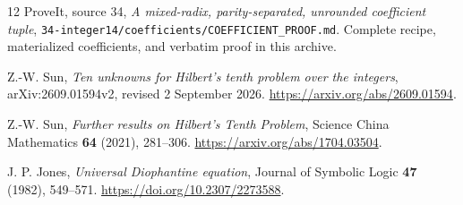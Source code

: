\documentclass[11pt,a4paper]{article}
\theoremstyle{definition}\newtheorem{definition}[theorem]{Definition}
\theoremstyle{remark}\newtheorem{remark}[theorem]{Remark}
\numberwithin{equation}{section}
\begin{document}
\begin{thebibliography}{12}
ProveIt, source 34,
\emph{A mixed-radix, parity-separated, unrounded coefficient tuple},
\texttt{34-integer14/coefficients/COEFFICIENT\_PROOF.md}.
Complete recipe, materialized coefficients, and verbatim proof in
this archive.

Z.-W. Sun, \emph{Ten unknowns for Hilbert's tenth problem over the
integers}, arXiv:2609.01594v2, revised 2 September 2026.
\url{https://arxiv.org/abs/2609.01594}.

Z.-W. Sun, \emph{Further results on Hilbert's Tenth Problem},
Science China Mathematics \textbf{64} (2021), 281--306.
\url{https://arxiv.org/abs/1704.03504}.

J. P. Jones, \emph{Universal Diophantine equation},
Journal of Symbolic Logic \textbf{47} (1982), 549--571.
\url{https://doi.org/10.2307/2273588}.
\end{thebibliography}
\end{document}
